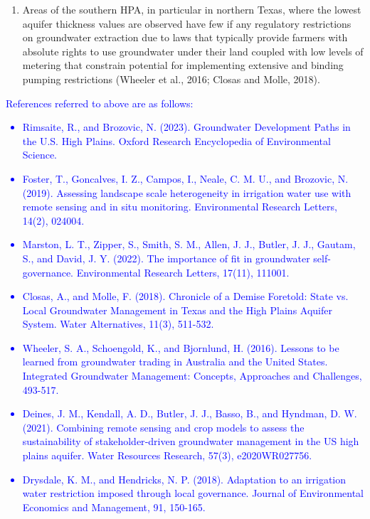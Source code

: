 \documentclass[
]{article}
\begin{document}
\begin{itemize}
\begin{itemize}
{\begin{enumerate}
      \item Areas of the southern HPA, in particular in northern Texas, where the lowest aquifer thickness values are observed have few if any regulatory restrictions on groundwater extraction due to laws that typically provide farmers with absolute rights to use groundwater under their land coupled with low levels of metering that constrain potential for implementing extensive and binding pumping restrictions (Wheeler et al., 2016; Closas and Molle, 2018). 
  \end{enumerate}
  }

  \textcolor{blue}{References referred to above are as follows:
  \begin{itemize}
      \item Rimsaite, R., and Brozovic, N.  (2023). Groundwater Development Paths in the U.S. High Plains. Oxford Research Encyclopedia of Environmental Science. 
      \item Foster, T., Goncalves, I. Z., Campos, I., Neale, C. M. U., and Brozovic, N. (2019). Assessing landscape scale heterogeneity in irrigation water use with remote sensing and in situ monitoring. Environmental Research Letters, 14(2), 024004.
      \item Marston, L. T., Zipper, S., Smith, S. M., Allen, J. J., Butler, J. J., Gautam, S., and David, J. Y. (2022). The importance of fit in groundwater self-governance. Environmental Research Letters, 17(11), 111001.
      \item Closas, A., and Molle, F. (2018). Chronicle of a Demise Foretold: State vs. Local Groundwater Management in Texas and the High Plains Aquifer System. Water Alternatives, 11(3), 511-532.
      \item Wheeler, S. A., Schoengold, K., and Bjornlund, H. (2016). Lessons to be learned from groundwater trading in Australia and the United States. Integrated Groundwater Management: Concepts, Approaches and Challenges, 493-517.
      \item Deines, J. M., Kendall, A. D., Butler, J. J., Basso, B., and Hyndman, D. W. (2021). Combining remote sensing and crop models to assess the sustainability of stakeholder‐driven groundwater management in the US high plains aquifer. Water Resources Research, 57(3), e2020WR027756.
      \item Drysdale, K. M., and Hendricks, N. P. (2018). Adaptation to an irrigation water restriction imposed through local governance. Journal of Environmental Economics and Management, 91, 150-165.
  \end{itemize}
  }
  

\end{itemize}
\end{itemize}
\end{document}
